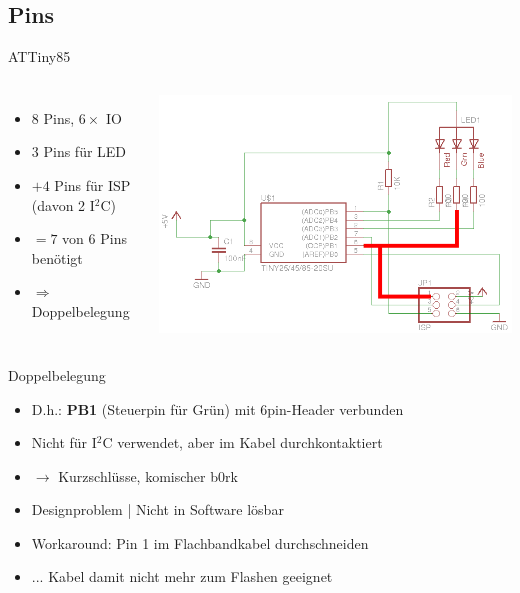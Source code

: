 \documentclass[compress]{beamer}
\begin{document}
\subsection{Pins}
\begin{frame}{ATTiny85}
\begin{columns}
\begin{itemize}
\item 8 Pins, $6\times$ IO
\item 3 Pins für LED
\item $+ 4$ Pins für ISP (davon 2 I$^2$C)
\item $= 7$ von 6 Pins benötigt
\item $\Rightarrow$ Doppelbelegung
\end{itemize}
\includegraphics[width=\textwidth]{circuit-err.png}
\end{columns}
\end{frame}

\begin{frame}{Doppelbelegung}
\begin{itemize}
\item D.h.: \textbf{PB1} (Steuerpin für Grün) mit 6pin-Header verbunden
\item Nicht für I$^2$C verwendet, aber im Kabel durchkontaktiert
\item $\to$ Kurzschlüsse, komischer b0rk
\end{itemize}
\begin{itemize}
\item Designproblem | Nicht in Software lösbar
\item Workaround: Pin 1 im Flachbandkabel durchschneiden
\item ... Kabel damit nicht mehr zum Flashen geeignet
\end{itemize}
\end{frame}
\end{document}
